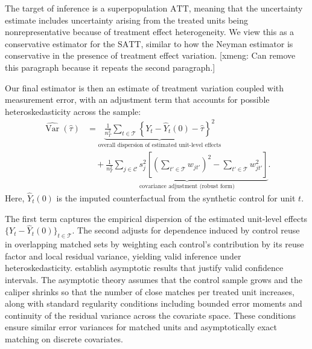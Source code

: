 \documentclass[11pt]{article}
\newcommand{\xmeng}[1]{
  {\color{blue} [xmeng: {#1}]}
 }
\newcommand{\Tset}{\mathcal{T}}
\newcommand{\Cset}{\mathcal{C}}
\newcommand{\Var}{\operatorname{Var}}
\newcommand{\ATT}{\mathrm{ATT}}
\newcommand{\SATT}{\mathrm{SATT}}
\begin{document}
The target of inference is a superpopulation $\ATT$, meaning that the uncertainty estimate includes uncertainty arising from the treated units being nonrepresentative because of treatment effect heterogeneity.
We view this as a conservative estimator for the $\SATT$, similar to how the Neyman estimator is conservative in the presence of treatment effect variation. \xmeng{Can remove this paragraph because it repeats the second paragraph.}


Our final estimator is then an estimate of treatment variation coupled with measurement error, with an adjustment term that accounts for possible heteroskedasticity across the sample:
\begin{align}
\label{eq:total-variance-estimator}
\widehat{\Var}(\hat{\tau})
&=
\underbrace{\frac{1}{n_T^2}\sum_{t\in\Tset}
\left\{Y_t-\hat{Y}_t(0)-\hat{\tau}\right\}^2}_{\text{overall dispersion of estimated unit-level effects}}
\nonumber\\
&\quad+
\underbrace{\frac{1}{n_T^2}\sum_{j\in\Cset} s_j^2
\left[
\left(\sum_{t'\in\Tset} w_{jt'}\right)^2
-
\sum_{t'\in\Tset} w_{jt'}^2
\right]}_{\text{covariance adjustment (robust form)}}.
\end{align}
Here, $\hat{Y}_t(0)$ is the imputed counterfactual from the synthetic control for unit $t$.

The first term captures the empirical dispersion of the estimated unit-level effects $\{Y_t-\hat{Y}_t(0)\}_{t\in\Tset}$.
The second adjusts for dependence induced by control reuse in overlapping matched sets by weighting each control's contribution by its reuse factor and local residual variance, yielding valid inference under heteroskedasticity.
\citet{meng2025varianceestimationmatchingreweighting} establish asymptotic results that justify valid confidence intervals.
The asymptotic theory assumes that the control sample grows and the caliper shrinks so that the number of close matches per treated unit increases, along with standard regularity conditions including bounded error moments and continuity of the residual variance across the covariate space.
These conditions ensure similar error variances for matched units and asymptotically exact matching on discrete covariates.
\end{document}
